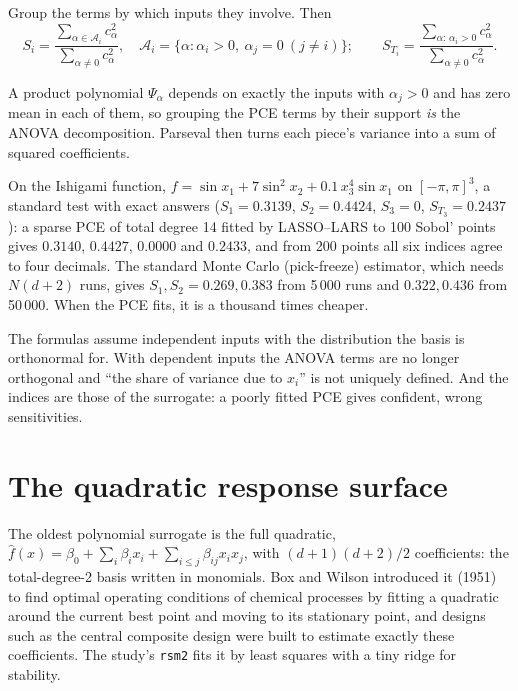 \begin{result}
Group the terms by which inputs they involve. Then
\begin{equation}
  S_i = \frac{\sum_{\alpha \in \mathcal{A}_i} c_\alpha^2}{\sum_{\alpha \ne 0} c_\alpha^2},\quad
  \mathcal{A}_i = \{\alpha: \alpha_i > 0,\ \alpha_j = 0 \ (j \ne i)\};\qquad
  S_{T_i} = \frac{\sum_{\alpha:\, \alpha_i > 0} c_\alpha^2}{\sum_{\alpha \ne 0} c_\alpha^2}.
\end{equation}
\end{result}
\begin{intuition}
A product polynomial $\Psi_\alpha$ depends on exactly the inputs with $\alpha_j > 0$ and has zero mean in each of
them, so grouping the PCE terms by their support \emph{is} the ANOVA decomposition. Parseval then turns each
piece's variance into a sum of squared coefficients.
\end{intuition}

On the Ishigami function, $f = \sin x_1 + 7\sin^2 x_2 + 0.1\,x_3^4\sin x_1$ on $[-\pi,\pi]^3$, a standard test with
exact answers ($S_1 = 0.3139$, $S_2 = 0.4424$, $S_3 = 0$, $S_{T_3} = 0.2437$): a sparse PCE of total degree 14 fitted
by LASSO--LARS to 100 Sobol' points gives $0.3140$, $0.4427$, $0.0000$ and $0.2433$, and from 200 points all six
indices agree to four decimals. The standard Monte Carlo (pick-freeze) estimator, which needs $N(d+2)$ runs, gives
$S_1, S_2 = 0.269, 0.383$ from 5\,000 runs and $0.322, 0.436$ from 50\,000. When the PCE fits, it is a thousand times
cheaper.

\begin{pitfall}
The formulas assume independent inputs with the distribution the basis is orthonormal for. With dependent inputs
the ANOVA terms are no longer orthogonal and ``the share of variance due to $x_i$'' is not uniquely defined. And the
indices are those of the surrogate: a poorly fitted PCE gives confident, wrong sensitivities.
\end{pitfall}

\section{The quadratic response surface}
\label{sec:rsm}

The oldest polynomial surrogate is the full quadratic,
$\hat f(x) = \beta_0 + \sum_i \beta_i x_i + \sum_{i \le j} \beta_{ij}x_ix_j$, with $(d+1)(d+2)/2$ coefficients: the
total-degree-2 basis written in monomials. Box and Wilson introduced it (1951) to find optimal operating conditions
of chemical processes by fitting a quadratic around the current best point and moving to its stationary point, and
designs such as the central composite design were built to estimate exactly these coefficients. The study's
\texttt{rsm2} fits it by least squares with a tiny ridge for stability.

